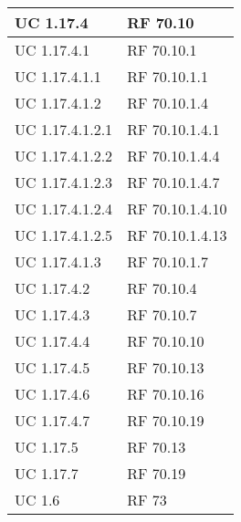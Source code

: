 {\begin{longtable} [c]{| p{4cm} | p{4cm} |}
 \hline 
UC 1.17.4 & RF 70.10\\ 
 \hline 
UC 1.17.4.1 & RF 70.10.1\\ 
 \hline 
UC 1.17.4.1.1 & RF 70.10.1.1\\ 
 \hline 
UC 1.17.4.1.2 & RF 70.10.1.4\\ 
 \hline 
UC 1.17.4.1.2.1 & RF 70.10.1.4.1\\ 
 \hline 
UC 1.17.4.1.2.2 & RF 70.10.1.4.4\\ 
 \hline 
UC 1.17.4.1.2.3 & RF 70.10.1.4.7\\ 
 \hline 
UC 1.17.4.1.2.4 & RF 70.10.1.4.10\\ 
 \hline 
UC 1.17.4.1.2.5 & RF 70.10.1.4.13\\ 
 \hline 
UC 1.17.4.1.3 & RF 70.10.1.7\\ 
 \hline 
UC 1.17.4.2 & RF 70.10.4\\ 
 \hline 
UC 1.17.4.3 & RF 70.10.7\\ 
 \hline 
UC 1.17.4.4 & RF 70.10.10\\ 
 \hline 
UC 1.17.4.5 & RF 70.10.13\\ 
 \hline 
UC 1.17.4.6 & RF 70.10.16\\ 
 \hline 
UC 1.17.4.7 & RF 70.10.19\\ 
 \hline 
UC 1.17.5 & RF 70.13\\ 
 \hline 
UC 1.17.7 & RF 70.19\\ 
 \hline 
UC 1.6 & RF 73\\ 
 \hline 
\end{longtable}}